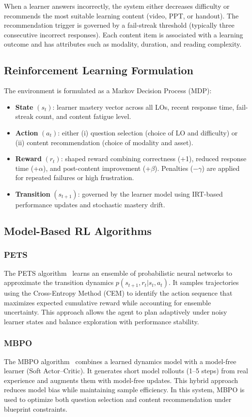 \documentclass[preprint,12pt]{elsarticle}
\begin{document}
\begin{frontmatter}
When a learner answers incorrectly, the system either decreases difficulty or recommends the most suitable learning content (video, PPT, or handout). The recommendation trigger is governed by a fail-streak threshold (typically three consecutive incorrect responses). Each content item is associated with a learning outcome and has attributes such as modality, duration, and reading complexity.  

\subsection{Reinforcement Learning Formulation}
The environment is formulated as a Markov Decision Process (MDP):
\begin{itemize}
\item \textbf{State} $(s_t)$: learner mastery vector across all LOs, recent response time, fail-streak count, and content fatigue level.
\item \textbf{Action} $(a_t)$: either (i) question selection (choice of LO and difficulty) or (ii) content recommendation (choice of modality and asset). 
\item \textbf{Reward} $(r_t)$: shaped reward combining correctness (+1), reduced response time (+$\alpha$), and post-content improvement (+$\beta$). Penalties (−$\gamma$) are applied for repeated failures or high frustration.
\item \textbf{Transition} $(s_{t+1})$: governed by the learner model using IRT-based performance updates and stochastic mastery drift.
\end{itemize}

\subsection{Model-Based RL Algorithms}
\subsubsection{PETS}
The PETS algorithm~\cite{chua2018pets} learns an ensemble of probabilistic neural networks to approximate the transition dynamics $p(s_{t+1}, r_t | s_t, a_t)$. It samples trajectories using the Cross-Entropy Method (CEM) to identify the action sequence that maximizes expected cumulative reward while accounting for ensemble uncertainty. This approach allows the agent to plan adaptively under noisy learner states and balance exploration with performance stability.

\subsubsection{MBPO}
The MBPO algorithm~\cite{janner2019mbpo} combines a learned dynamics model with a model-free learner (Soft Actor–Critic). It generates short model rollouts (1–5 steps) from real experience and augments them with model-free updates. This hybrid approach reduces model bias while maintaining sample efficiency. In this system, MBPO is used to optimize both question selection and content recommendation under blueprint constraints.


\end{frontmatter}
\end{document}
